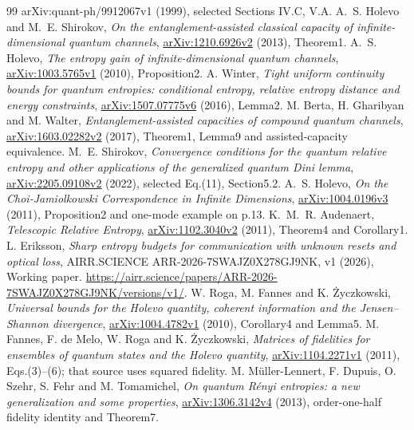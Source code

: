 \documentclass[11pt]{article}
\begin{document}
\begin{thebibliography}{99}
{arXiv:quant-ph/9912067v1} (1999), selected Sections IV.C, V.A.
 A.~S. Holevo and M.~E. Shirokov,
\emph{On the entanglement-assisted classical capacity of
infinite-dimensional quantum channels},
\href{https://arxiv.org/abs/1210.6926v2}{arXiv:1210.6926v2}
(2013), Theorem1.
 A.~S. Holevo,
\emph{The entropy gain of infinite-dimensional quantum channels},
\href{https://arxiv.org/abs/1003.5765v1}{arXiv:1003.5765v1}
(2010), Proposition2.
 A. Winter,
\emph{Tight uniform continuity bounds for quantum entropies:
conditional entropy, relative entropy distance and energy constraints},
\href{https://arxiv.org/abs/1507.07775v6}{arXiv:1507.07775v6}
(2016), Lemma2.
 M. Berta, H. Gharibyan and M. Walter,
\emph{Entanglement-assisted capacities of compound quantum channels},
\href{https://arxiv.org/abs/1603.02282v2}{arXiv:1603.02282v2}
(2017), Theorem1, Lemma9 and assisted-capacity equivalence.
 M.~E. Shirokov,
\emph{Convergence conditions for the quantum relative entropy and other
applications of the generalized quantum Dini lemma},
\href{https://arxiv.org/abs/2205.09108v2}{arXiv:2205.09108v2}
(2022), selected Eq.(11), Section5.2.
 A.~S. Holevo,
\emph{On the Choi-Jamiolkowski Correspondence in Infinite Dimensions},
\href{https://arxiv.org/abs/1004.0196v3}{arXiv:1004.0196v3}
(2011), Proposition2 and one-mode example on p.13.
 K.~M.~R. Audenaert,
\emph{Telescopic Relative Entropy},
\href{https://arxiv.org/abs/1102.3040v2}{arXiv:1102.3040v2}
(2011), Theorem4 and Corollary1.
 L. Eriksson,
\emph{Sharp entropy budgets for communication with unknown resets and
optical loss}, AIRR.SCIENCE ARR-2026-7SWAJZ0X278GJ9NK, v1
(2026), Working paper.
\url{https://airr.science/papers/ARR-2026-7SWAJZ0X278GJ9NK/versions/v1/}.
 W. Roga, M. Fannes and K. \.{Z}yczkowski,
\emph{Universal bounds for the Holevo quantity, coherent information
and the Jensen--Shannon divergence},
\href{https://arxiv.org/abs/1004.4782v1}{arXiv:1004.4782v1}
(2010), Corollary4 and Lemma5.
 M. Fannes, F. de Melo, W. Roga and K. \.{Z}yczkowski,
\emph{Matrices of fidelities for ensembles of quantum states and
the Holevo quantity},
\href{https://arxiv.org/abs/1104.2271v1}{arXiv:1104.2271v1}
(2011), Eqs.(3)--(6); that source uses squared fidelity.
 M. M\"uller-Lennert, F. Dupuis, O. Szehr,
S. Fehr and M. Tomamichel,
\emph{On quantum R\'enyi entropies: a new generalization and some
properties},
\href{https://arxiv.org/abs/1306.3142v4}{arXiv:1306.3142v4}
(2013), order-one-half fidelity identity and Theorem7.
\end{thebibliography}
\end{document}
